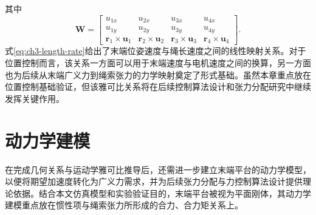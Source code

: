 其中
\begin{equation}
  \bm W=
  \begin{bmatrix}
    u_{1x} & u_{2x} & u_{3x} & u_{4x} \\
    u_{1y} & u_{2y} & u_{3y} & u_{4y} \\
    \bm r_1\times \bm u_1 &
    \bm r_2\times \bm u_2 &
    \bm r_3\times \bm u_3 &
    \bm r_4\times \bm u_4
  \end{bmatrix}.
  \label{eq:ch3-wrench-matrix}
\end{equation}
式\eqref{eq:ch3-length-rate}给出了末端位姿速度与绳长速度之间的线性映射关系。对于位置控制而言，该关系一方面可以用于末端速度与电机速度之间的换算，另一方面也为后续从末端广义力到绳索张力的力学映射奠定了形式基础。虽然本章重点放在位置控制基础验证，但该雅可比关系将在后续控制算法设计和张力分配研究中继续发挥关键作用。

\section{动力学建模}

在完成几何关系与运动学雅可比推导后，还需进一步建立末端平台的动力学模型，以便将期望加速度转化为广义力需求，并为后续张力分配与力控制算法设计提供理论依据。结合本文仿真模型和实验验证目的，末端平台被视为平面刚体，其动力学建模重点放在惯性项与绳索张力所形成的合力、合力矩关系上。

